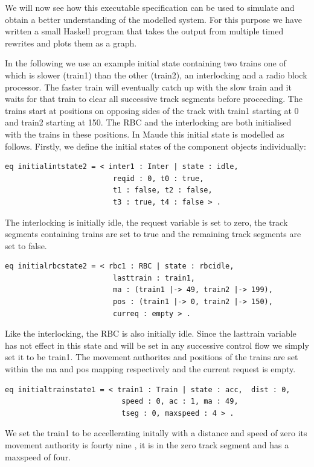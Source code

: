 We will now see how this executable specification can be used to simulate and obtain a better understanding of the modelled system. For this purpose we have written a small Haskell program that takes the output from multiple timed rewrites and plots them as a graph.

In the following we use an example initial state containing two trains one of which is slower (train1) than the other (train2), an interlocking and a radio block processor. The faster train will eventually catch up with the slow train and it waits for that train to clear all successive track segments before proceeding. The trains start at positions on opposing sides of the track with train1 starting at 0 and train2 starting at 150. The RBC and the interlocking are both initialised with the trains in these positions. In Maude this initial state is modelled as follows. Firstly, we define the initial states of the component objects individually:

\begin{lstlisting}[caption = The initial interlocking state in Maude]
 eq initialintstate2 = < inter1 : Inter | state : idle, 
                         reqid : 0, t0 : true, 
                         t1 : false, t2 : false, 
                         t3 : true, t4 : false > .
\end{lstlisting}

The  interlocking is initially idle, the request variable is set to zero, the track segments containing trains are set to true and the remaining track segments are set to false.

\begin{lstlisting}[caption = The initial RBC state in Maude]
 eq initialrbcstate2 = < rbc1 : RBC | state : rbcidle, 
                         lasttrain : train1,  
                         ma : (train1 |-> 49, train2 |-> 199), 
                         pos : (train1 |-> 0, train2 |-> 150), 
                         curreq : empty > .
\end{lstlisting}

Like the interlocking, the RBC is also initially idle. Since the lasttrain variable has not effect in this state and will be set in any successive control flow we simply set it to be train1. The movement authorites  and positions of the trains are set within the ma and pos mapping respectively and the current request is empty.  

\begin{lstlisting}[caption = The intital state of train2 in Maude]
 eq initialtrainstate1 = < train1 : Train | state : acc,  dist : 0, 
                           speed : 0, ac : 1, ma : 49, 
                           tseg : 0, maxspeed : 4 > .
\end{lstlisting}
We set the train1 to be accellerating initally with a distance and speed of zero its movement authority is fourty nine , it is in the zero track segment and has a maxspeed of four. 

